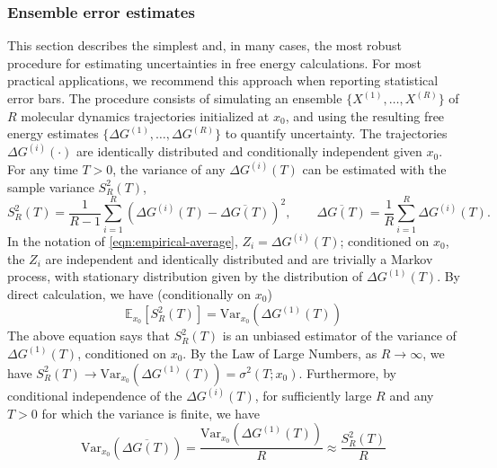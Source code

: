 \documentclass[9pt,bestpractices]{livecoms}
\begin{document}
\subsubsection{Ensemble error estimates}

This section describes the simplest and, in many cases, the most robust procedure for estimating uncertainties in free energy calculations. For most practical applications, we recommend this approach when reporting statistical error bars. The procedure consists of simulating an ensemble $\{X^{(1)},\ldots,X^{(R)}\}$ of $R$ molecular dynamics trajectories initialized at $x_0$, and using the resulting free energy estimates $\{\Delta G^{(1)},\ldots,\Delta G^{(R)}\}$ to quantify uncertainty. The trajectories $\Delta
G^{(i)} (\cdot)$ are identically distributed and conditionally independent given $x_0$. For any time $T > 0$, the variance of any $\Delta G^{(i)} (T)$ can be estimated with the sample variance $S^2_{R} (T)$,
\begin{equation}\label{eq:sample-variance-definition}
  S^2_R (T) = \frac{1}{R - 1} \sum_{i = 1}^R (\Delta G^{(i)} (T) -
  \overline{\Delta G (T)})^2, \qquad \overline{\Delta G (T)} = \frac{1}{R}
  \sum_{i = 1}^R \Delta G^{(i)} (T) .
\end{equation}
In the notation of \eqref{eqn:empirical-average}, $Z_i = \Delta G^{(i)}(T)$; conditioned on $x_0$, the $Z_i$ are independent and identically distributed and are trivially a Markov process, with stationary distribution given by the distribution of $\Delta G^{(1)}(T)$. By direct calculation, we have (conditionally on $x_0$)
\begin{equation}
    \mathbb{E}_{x_0}[S_R^2(T)] = \mathrm{Var}_{x_0}(\Delta G^{(1)}(T))
\end{equation}
The above equation says that $S_R^2(T)$ is an unbiased estimator of the variance of $\Delta G^{(1)}(T)$, conditioned on $x_0$. By the Law of Large Numbers, as $R \rightarrow \infty$, we have $S^2_R (T) \rightarrow \mathrm{Var} _{x_0}(\Delta
G^{(1)} (T)) = \sigma^2 (T ; x_0)$. Furthermore, by conditional independence of the $\Delta G^{(i)}(T)$, for sufficiently large $R$ and any $T>0$ for which the variance is finite, we have
\begin{equation}\label{eqn:variance-of-empirical-mean}
\mathrm{Var}_{x_0}(\overline{\Delta G(T)}) = \frac{\mathrm{Var}_{x_0}(\Delta G^{(1)}(T))}{R} \approx \frac{S_R^2(T)}{R}
\end{equation}
\end{document}
